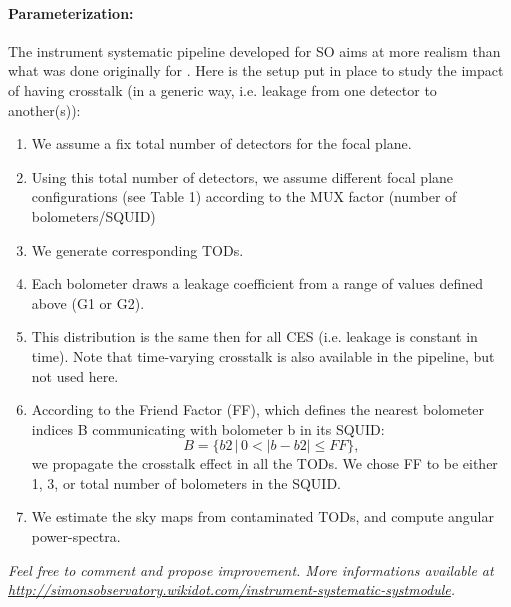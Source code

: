\paragraph{Parameterization:}
The instrument systematic pipeline developed for SO aims at more realism than what was done originally for \pb. 
Here is the setup put in place to study the impact of having crosstalk (in a generic way, i.e. leakage from one detector to another(s)):
\begin{enumerate}
\item{We assume a fix total number of detectors for the focal plane.}
\item{Using this total number of detectors, we assume different focal plane configurations (see Table 1) according to the MUX factor (number of bolometers/SQUID)}
\item{We generate corresponding TODs.}
\item{Each bolometer draws a leakage coefficient from a range of values defined above (G1 or G2).}
\item{This distribution is the same then for all CES (i.e. leakage is constant in time). Note that time-varying crosstalk is also available in the pipeline, but not used here.}
\item{According to the Friend Factor (FF), which defines the nearest bolometer indices B communicating with bolometer b in its SQUID: 
\begin{equation}
B = \{ b2\, |\, 0 < |b-b2| \leq FF \},
\end{equation} 
we propagate the crosstalk effect in all the TODs. We chose FF to be either 1, 3, or total number of bolometers in the SQUID.}
\item{We estimate the sky maps from contaminated TODs, and compute angular power-spectra.}
\end{enumerate}
\textit{Feel free to comment and propose improvement. More informations available at \url{http://simonsobservatory.wikidot.com/instrument-systematic-systmodule}.}

